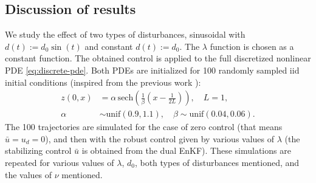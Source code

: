 \documentclass[10pt,a4paper]{amsart}
\begin{document}

\subsection{Discussion of results}
We study the effect of two types of disturbances, sinusoidal with $d(t) := d_0\sin(t)$ and constant $d(t) := d_0$. The $\lambda$ function is chosen as a constant function. The obtained control is applied to the full discretized nonlinear PDE \eqref{eq:discrete-pde}. %
Both PDEs are initialized for 100 randomly sampled iid initial conditions (inspired from the previous work \cite{zhang-2024}): 
\begin{align*}
    z(0,x) &= \alpha \, \mathrm{sech}\left(\frac{1}{\beta}\left({x} - \frac{1}{2L}\right)\right), \quad L=1, \; \\ 
    \alpha &\sim \mathrm{unif}(0.9, 1.1), \quad \beta \sim \mathrm{unif}(0.04, 0.06).
\end{align*}
The 100 trajectories are simulated for the case of zero control (that means $\bar{u} = u_d = 0$), and then with the robust control given by various values of $\lambda$ (the stabilizing control $\bar{u}$ is obtained from the dual EnKF). These simulations are repeated for various values of $\lambda$, $d_0$, both types of disturbances mentioned, and the values of $\nu$ mentioned. 

\end{document}
